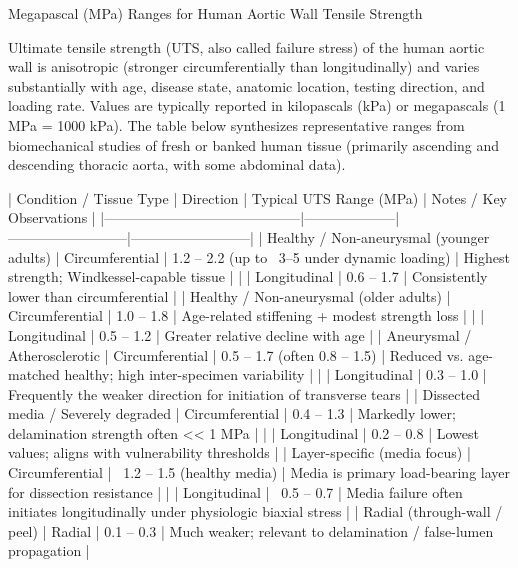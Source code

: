 Megapascal (MPa) Ranges for Human Aortic Wall Tensile Strength

Ultimate tensile strength (UTS, also called failure stress) of the human aortic wall is anisotropic (stronger circumferentially than longitudinally) and varies substantially with age, disease state, anatomic location, testing direction, and loading rate. Values are typically reported in kilopascals (kPa) or megapascals (1 MPa = 1000 kPa). The table below synthesizes representative ranges from biomechanical studies of fresh or banked human tissue (primarily ascending and descending thoracic aorta, with some abdominal data).

| Condition / Tissue Type                  | Direction          | Typical UTS Range (MPa) | Notes / Key Observations |
|------------------------------------------|--------------------|--------------------------|--------------------------|
| Healthy / Non-aneurysmal (younger adults) | Circumferential   | 1.2 – 2.2 (up to ~3–5 under dynamic loading) | Highest strength; Windkessel-capable tissue |
|                                          | Longitudinal      | 0.6 – 1.7               | Consistently lower than circumferential |
| Healthy / Non-aneurysmal (older adults) | Circumferential   | 1.0 – 1.8               | Age-related stiffening + modest strength loss |
|                                          | Longitudinal      | 0.5 – 1.2               | Greater relative decline with age |
| Aneurysmal / Atherosclerotic         | Circumferential   | 0.5 – 1.7 (often 0.8 – 1.5) | Reduced vs. age-matched healthy; high inter-specimen variability |
|                                          | Longitudinal      | 0.3 – 1.0               | Frequently the weaker direction for initiation of transverse tears |
| Dissected media / Severely degraded  | Circumferential   | 0.4 – 1.3               | Markedly lower; delamination strength often << 1 MPa |
|                                          | Longitudinal      | 0.2 – 0.8               | Lowest values; aligns with vulnerability thresholds |
| Layer-specific (media focus)         | Circumferential   | ~1.2 – 1.5 (healthy media) | Media is primary load-bearing layer for dissection resistance |
|                                          | Longitudinal      | ~0.5 – 0.7              | Media failure often initiates longitudinally under physiologic biaxial stress |
| Radial (through-wall / peel)         | Radial            | 0.1 – 0.3               | Much weaker; relevant to delamination / false-lumen propagation |

